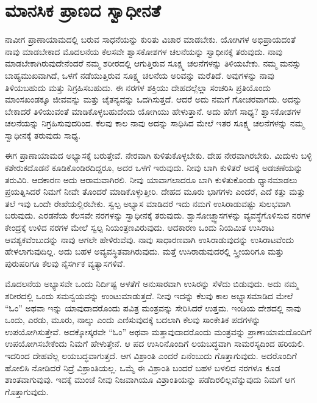 \chapter{ಮಾನಸಿಕ ಪ್ರಾಣದ ಸ್ವಾಧೀನತೆ}%

ನಾವೀಗ ಪ್ರಾಣಾಯಾಮದಲ್ಲಿ ಬರುವ ಸಾಧನೆಯನ್ನು ಕುರಿತು ವಿಚಾರ ಮಾಡಬೇಕು. ಯೋಗಿಗಳ ಅಭಿಪ್ರಾಯದಂತೆ ನಾವು ಮಾಡಬೇಕಾದ ಮೊದಲನೆಯ ಕೆಲಸವೇ ಶ್ವಾಸಕೋಶಗಳ ಚಲನೆಯನ್ನು ಸ್ವಾಧೀನಕ್ಕೆ ತರುವುದು. ನಾವು ಮಾಡಬೇಕಾಗಿರುವುದೇನೆಂದರೆ ನಮ್ಮ ಶರೀರದಲ್ಲಿ ಆಗುತ್ತಿರುವ ಸೂಕ್ಷ್ಮ ಚಲನೆಗಳನ್ನು ತಿಳಿಯಬೇಕು. ನಮ್ಮ ಮನಸ್ಸು ಬಾಹ್ಯಮುಖವಾಗಿದೆ, ಒಳಗೆ ನಡೆಯುತ್ತಿರುವ ಸೂಕ್ಷ್ಮ ಚಲನೆಯ ಅರಿವನ್ನು ಮರೆತಿದೆ. ಅವುಗಳನ್ನು ನಾವು ತಿಳಿಯಬಹುದು ಮತ್ತು ನಿಗ್ರಹಿಸಬಹುದು. ಈ ನರಗಳ ಶಕ್ತಿಯು ದೇಹದಲ್ಲೆಲ್ಲಾ ಸಂಚರಿಸಿ ಪ್ರತಿಯೊಂದು ಮಾಂಸಖಂಡಕ್ಕೂ ಜೀವವನ್ನು ಮತ್ತು ಚೈತನ್ಯವನ್ನು ಒದಗಿಸುತ್ತದೆ. ಆದರೆ ಅದು ನಮಗೆ ಗೋಚರವಾಗದು. ಅದನ್ನು ಬೇಕಾದರೆ ತಿಳಿಯುವಂತೆ ಮಾಡಿಕೊಳ್ಳಬಹುದೆಂದು ಯೋಗಿಯು ಹೇಳುತ್ತಾನೆ. ಅದು ಹೇಗೆ ಸಾಧ್ಯ? ಶ್ವಾಸಕೋಶಗಳ ಚಲನೆಯನ್ನು ನಿಗ್ರಹಿಸುವುದರಿಂದ. ಕೆಲವು ಕಾಲ ನಾವು ಅದನ್ನು ಸಾಧಿಸಿದ ಮೇಲೆ ಇತರ ಸೂಕ್ಷ್ಮ ಚಲನೆಗಳನ್ನು ನಮ್ಮ ಸ್ವಾಧೀನಕ್ಕೆ ತರುವುದು ಸಾಧ್ಯ. 

ಈಗ ಪ್ರಾಣಾಯಾಮದ ಅಭ್ಯಾಸಕ್ಕೆ ಬರುತ್ತೇವೆ. ನೇರವಾಗಿ ಕುಳಿತುಕೊಳ್ಳಬೇಕು. ದೇಹ ನೇರವಾಗಿರಬೇಕು. ಮಿದುಳು ಬಳ್ಳಿ ಕಶೇರುಕದೊಡನೆ ಕೂಡಿಕೊಂಡಿರದಿದ್ದರೂ, ಅದರ ಒಳಗೆ ಇರುವುದು. ನೀವು ಬಾಗಿ ಕುಳಿತರೆ ಅದಕ್ಕೆ ಅಡಚಣೆಯನ್ನು ತರುವಿರಿ. ಆದಕಾರಣ ಅದು ಆರಾಮವಾಗಿರಲಿ. ನೀವು ಯಾವಾಗಲಾದರೂ ಬಾಗಿ ಕುಳಿತುಕೊಂಡು ಧ್ಯಾನಮಾಡಲು ಪ್ರಯತ್ನಿಸಿದರೆ ನಿಮಗೆ ನೀವೇ ತೊಂದರೆ ಮಾಡಿಕೊಳ್ಳುತ್ತೀರಿ. ದೇಹದ ಮೂರು ಭಾಗಗಳು ಎಂದರೆ, ಎದೆ ಕತ್ತು ಮತ್ತು ತಲೆ ಇವು ಒಂದೇ ರೇಖೆಯಲ್ಲಿರಬೇಕು. ಸ್ವಲ್ಪ ಅಭ್ಯಾಸ ಮಾಡಿದರೆ ಇದು ನಮಗೆ ಉಸಿರಾಡುವಷ್ಟು ಸುಲಭವಾಗಿ ಬರುವುದು. ಎರಡನೆಯ ಕೆಲಸವೇ ನರಗಳನ್ನು ಸ್ವಾಧೀನಕ್ಕೆ ತರುವುದು. ಶ್ವಾಸೋಚ್ಛ್ವಾಸಗಳನ್ನು ವ್ಯವಸ್ಥೆಗೊಳಿಸುವ ನರಗಳ ಕೇಂದ್ರಕ್ಕೆ  ಉಳಿದ ನರಗಳ ಮೇಲೆ ಸ್ವಲ್ಪ ನಿಯಂತ್ರಣವಿರುವುದು. ಆದಕಾರಣ ಒಂದು ನಿಯಮಿತ ಉಸಿರಾಟ ಆವಶ್ಯಕವೆಂಬುದನ್ನು ನಾವು ಆಗಲೇ ಹೇಳಿರುವೆವು. ನಾವು ಸಾಧಾರಣವಾಗಿ ಉಸಿರಾಡುವುದನ್ನು ಉಸಿರಾಟವೆಂದು ಹೇಳಲಾಗುವುದಿಲ್ಲ. ಅದು ಬಹಳ ಅವ್ಯವಸ್ಥಿತವಾಗಿರುವುದು. ಮತ್ತೆ ಉಸಿರಾಡುವುದರಲ್ಲಿ ಸ್ತ್ರೀಯರಿಗೂ ಮತ್ತು ಪುರುಷರಿಗೂ ಕೆಲವು ನೈಸರ್ಗಿಕ ವ್ಯತ್ಯಾಸಗಳಿವೆ. 

ಮೊದಲನೆಯ ಅಭ್ಯಾಸವೇ ಒಂದು ನಿರ್ದಿಷ್ಟ ಅಳತೆಗೆ ಅನುಸಾರವಾಗಿ ಉಸಿರನ್ನು ಸೆಳೆದು ಬಿಡುವುದು. ಅದು ನಮ್ಮ ಶರೀರದಲ್ಲಿ ಒಂದು ಸಮನ್ವಯವನ್ನು ಉಂಟುಮಾಡುತ್ತದೆ. ನೀವು ಇದನ್ನು ಕೆಲವು ಕಾಲ ಅಭ್ಯಾಸಮಾಡಿದ ಮೇಲೆ “ಓಂ” ಅಥವಾ ಇನ್ನು ಯಾವುದಾದರೊಂದು ಪವಿತ್ರ ಮಂತ್ರವನ್ನು ಸೇರಿಸಿದರೆ ಉತ್ತಮ. ಇಂಡಿಯ ದೇಶದಲ್ಲಿ ನಾವು ಒಂದು, ಎರಡು, ಮೂರು, ನಾಲ್ಕು ಎಂದು ಎಣಿಸುವುದಕ್ಕೆ ಬದಲಾಗಿ ಕೆಲವು ಸಾಂಕೇತಿಕ ಪದಗಳನ್ನು ಉಪಯೋಗಿಸುತ್ತೇವೆ. ಅದಕ್ಕೋಸ್ಕರವೇ “ಓಂ” ಅಥವಾ ಮತ್ತಾವುದಾದರೊಂದು ಮಂತ್ರವನ್ನು ಪ್ರಾಣಾಯಾಮದೊಂದಿಗೆ ಉಪಯೋಗಿಸಬೇಕೆಂದು ನಿಮಗೆ ಹೇಳುತ್ತೇನೆ. ಆ ಪದ ಉಸಿರಿನೊಂದಿಗೆ ಲಯಬದ್ಧವಾಗಿ ಸಾಮರಸ್ಯದಿಂದ ಹರಿಯಲಿ. ಇದರಿಂದ ದೇಹವೆಲ್ಲ ಲಯಬದ್ಧವಾಗುತ್ತದೆ. ಆಗ ವಿಶ್ರಾಂತಿ ಎಂದರೆ ಏನೆಂಬುದು ಗೊತ್ತಾಗುವುದು. ಅದರೊಂದಿಗೆ ಹೋಲಿಸಿ ನೋಡಿದರೆ ನಿದ್ರೆ ವಿಶ್ರಾಂತಿಯಲ್ಲ. ಒಮ್ಮೆ ಈ ವಿಶ್ರಾಂತಿ ಬಂದರೆ ಬಹಳ ಬಳಲಿದ ನರಗಳೂ ಕೂಡ ಶಾಂತವಾಗುವುವು. ಇದಕ್ಕೆ ಮುಂಚೆ ನೀವು ನಿಜವಾಗಿಯೂ ವಿಶ್ರಾಂತಿಯನ್ನು ಪಡೆದಿರಲಿಲ್ಲವೆನ್ನುವುದು ನಿಮಗೆ ಆಗ ಗೊತ್ತಾಗುವುದು. 

